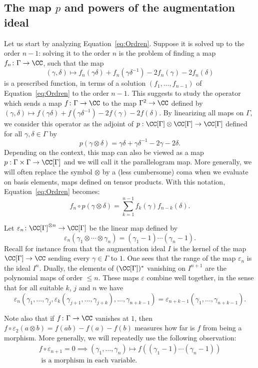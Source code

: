 \subsection{The map $p$ and powers of the augmentation ideal}

Let us start by analyzing Equation~\eqref{eq:Ordren}. Suppose it is solved
up to the order
$n-1$: solving it to the order
$n$ is the problem of finding
a map $f_n\colon\Gamma\to\CC$, such that the map
\[ (\gamma,\delta)\mapsto f_n(\gamma\delta)+f_n(\gamma\delta^{-1})
-2f_n(\gamma)-2f_n(\delta) \]
is a prescribed function, in terms of a solution
$(f_1,\ldots,f_{n-1})$ of
Equation~\eqref{eq:Ordren} to the order $n-1$.
This suggests to study the operator
which sends a map $f\colon\Gamma\to\CC$ to the map $\Gamma^2\to\CC$ defined by
$(\gamma,\delta)\mapsto f(\gamma\delta)+f(\gamma\delta^{-1})-2f(\gamma)
-2f(\delta)$.
By linearizing all maps on $\Gamma$, we consider this operator as the
adjoint of
$p:\CC[\Gamma]\otimes\CC[\Gamma]\to\CC[\Gamma]$ defined for all
$\gamma,\delta\in \Gamma$ by
\[ p(\gamma\otimes\delta)=\gamma\delta+\gamma\delta^{-1}-2\gamma-2\delta. \]
Depending on the context, this map can also be viewed as a map
$p:\Gamma\times \Gamma\to\CC[\Gamma]$ and we will call it the parallelogram
map. More generally, we will often replace the symbol
$\otimes$ by a (less cumbersome) coma when we evaluate on basis elements,
maps defined on tensor products.
With this notation, Equation~\eqref{eq:Ordren} becomes:
\begin{equation}\label{eq:Oordren}
f_n\circ p(\gamma\otimes\delta) =
\sum_{k=1}^{n-1}f_k(\gamma)f_{n-k}(\delta).
\end{equation}

Let $\varepsilon_n\colon\CC[\Gamma]^{\otimes n}\to\CC[\Gamma]$ be the
linear map defined by
\[ \varepsilon_n(\gamma_1\otimes\cdots\otimes\gamma_n)
=(\gamma_1-1)\cdots(\gamma_n-1). \]
Recall for instance from \cite{Passi} that the augmentation ideal $I$ is the
kernel of the map $\CC[\Gamma]\to\CC$ sending every $\gamma\in \Gamma$ to $1$.
One sees that the range of the map $\varepsilon_n$ is the ideal $I^n$.
Dually, the elements of $(\CC[\Gamma])^*$ vanishing on $I^{n+1}$ are the
polynomial maps of order $\leq n$.
These maps $\varepsilon$ combine well together, in the sense that for all
suitable $k$, $j$ and $n$ we have
\[
\varepsilon_n(\gamma_1,\dots,\gamma_j,
\varepsilon_k(\gamma_{j+1},\dots,\gamma_{j+k}),\dots,\gamma_{n+k-1})=
\varepsilon_{n+k-1}(\gamma_1,\dots,\gamma_{n+k-1}).
\]

Note also that if $f\colon\Gamma\to\CC$ vanishes at $1$, then
$f\circ\varepsilon_2(a\otimes b)=f(ab)-f(a)-f(b)$ measures how far is
$f$ from being a morphism. More generally, we will repeatedly use the
following observation:
\begin{multline}\label{testmulti}
f\circ\varepsilon_{n+1}=0\implies
(\gamma_1,\ldots,\gamma_n)\mapsto f((\gamma_1-1)\cdots(\gamma_n-1))\\[-3pt]
\text{ is a morphism in each variable.}
\end{multline}

